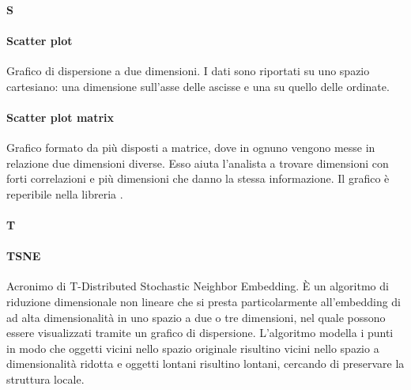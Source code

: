 \paragraph*{S}

\paragraph*{Scatter plot}
Grafico di dispersione a due dimensioni. I dati sono riportati su uno spazio cartesiano: una dimensione sull'asse delle ascisse e una su quello delle ordinate.

\paragraph*{Scatter plot matrix}
Grafico formato da più  disposti a matrice, dove in ognuno vengono messe in relazione due dimensioni diverse. Esso aiuta l'analista a trovare dimensioni con forti correlazioni e più  dimensioni che danno la stessa informazione. Il grafico è reperibile nella libreria .

\paragraph*{T}

\paragraph*{TSNE}
Acronimo di T-Distributed Stochastic Neighbor Embedding. È un algoritmo di riduzione dimensionale non lineare che si presta particolarmente all'embedding di  ad alta dimensionalità in uno spazio a due o tre dimensioni, nel quale possono essere visualizzati tramite un grafico di dispersione. L'algoritmo modella i punti in modo che oggetti vicini nello spazio originale risultino vicini nello spazio a dimensionalità ridotta e oggetti lontani risultino lontani, cercando di preservare la struttura locale.
